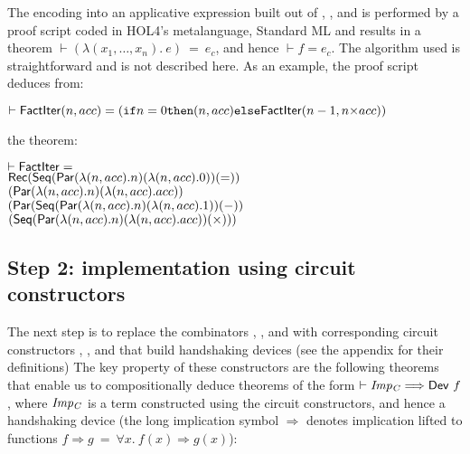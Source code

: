 The encoding into an applicative expression built out of ,
,  and  is performed by a proof script
coded in HOL4's metalanguage, Standard ML and results in a theorem $\vdash (\lambda(x_1,\ldots,x_n).~e)~=~e_c$,
and hence $\vdash f=e_c$.
The algorithm used is straightforward
and is not described here. As an example, the proof script deduces
from:

\vspace*{-2mm}

\begin{alltt}
\( \vdash \DEF{FactIter}(n,acc) = (\texttt{if} n=0 \texttt{then} (n,acc) \texttt{else} \DEF{FactIter}(n-1,n{\times}acc)) \)
\end{alltt}

\vspace*{-1mm}

\noindent the theorem:

\vspace*{-1mm}

{\baselineskip10pt\begin{alltt}
\( \vdash \DEF{FactIter} =                                                                        \)
\(     \DEF{Rec} (\DEF{Seq} (\DEF{Par} ({\lambda}(n,acc). n) ({\lambda}(n,acc). 0)) ({=}))        \)
\(         (\DEF{Par} ({\lambda}(n,acc). n) ({\lambda}(n,acc). acc))                              \)
\(         (\DEF{Par} (\DEF{Seq} (\DEF{Par} ({\lambda}(n,acc). n) ({\lambda}(n,acc). 1)) ({-}))   \)
\(              (\DEF{Seq} (\DEF{Par} ({\lambda}(n,acc). n) ({\lambda}(n,acc). acc)) ({\times}))) \)
\end{alltt}}

\vspace*{-3mm}

\subsection*{Step 2: implementation using circuit constructors}

The next step is to replace the combinators ,
,  and  with corresponding circuit constructors
,
,  and  that build handshaking devices (see the appendix for their definitions)
The key property of these constructors
are the following theorems that enable us to compositionally deduce
theorems of the form $\vdash {\it{Imp_C}}
\Longrightarrow \mathsf{Dev}~f$, where ${\it{Imp_C}}$ is a term
constructed using  the circuit constructors, and hence a handshaking device
(the long implication symbol $\Longrightarrow$ denotes
implication lifted to functions
$f \Longrightarrow g~=~\forall x.~f(x)\Rightarrow g(x)$): 

